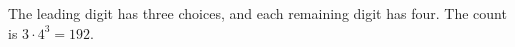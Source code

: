 The leading digit has three choices, and each remaining digit has four. The count is $3\cdot4^3=\boxed{192}$.
